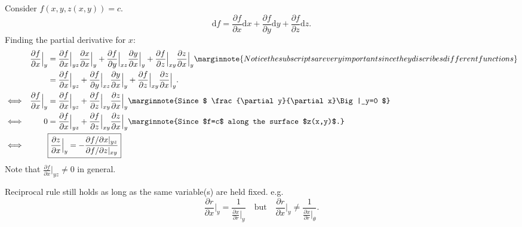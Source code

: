 \documentclass[10pt]{article}
\def\d{{\mathrm d}}
\begin{document}
        Consider $ f(x,y,z(x,y))=c $.
        \[
            \d f = \frac{\partial f}{\partial x}\d x+ \frac{\partial f}{\partial y}\d y+ \frac{\partial f}{\partial z}\d z   
        .\]
        Finding the partial derivative for $x$: 
        \[
            \begin{aligned}
                && \frac{\partial f}{\partial x}\Big|_y &= \frac{\partial f}{\partial x}\Big|_{yz}\frac{\partial x}{\partial x}\Big|_y+\frac{\partial f}{\partial y}\Big|_{xz}\frac{\partial y}{\partial x}\Big|_y+\frac{\partial f}{\partial z}\Big|_{xy}\frac{\partial z}{\partial x}\Big|_y\marginnote{Notice the subscripts are very important since they discribes different functions}\\
                && &= \frac{\partial f}{\partial x}\Big|_{yz}+\frac{\partial f}{\partial y}\Big|_{xz}\frac{\partial y}{\partial x}\Big|_y+\frac{\partial f}{\partial z}\Big|_{xy}\frac{\partial z}{\partial x}\Big|_y.\\
                &\Longleftrightarrow &\frac{\partial f}{\partial x}\Big|_y&=\frac{\partial f}{\partial x}\Big|_{yz}+\frac{\partial f}{\partial z}\Big|_{xy}\frac{\partial z}{\partial x}\Big|_y  \marginnote{Since $ \frac{\partial y}{\partial x}\Big|_y=0  $}  \\    
                &\Longleftrightarrow &0 &= \frac{\partial f}{\partial x}\Big|_{yz}+\frac{\partial f}{\partial z}\Big|_{xy}\frac{\partial z}{\partial x}\Big|_y \marginnote{Since $f=c$ along the surface $z(x,y)$.} \\
                &\Longleftrightarrow && \boxed{\frac{\partial z}{\partial x}\Big|_y=-\frac{\partial f/ \partial x|_{yz}}{\partial f/\partial z|_{xy}} }    
            \end{aligned}
        \]
        Note that $ \frac{\partial f}{\partial x}\Big|_{yz} \neq 0 $ in general.
        \begin{remark}
            Reciprocal rule still holds as long as the same variable(s) are held fixed. e.g.
            \[
                \frac{\partial r}{\partial x}\Big|_y = \frac{1}{\frac{\partial x}{\partial r}\Big|_y }\quad\text{but}\quad  \frac{\partial r}{\partial x}\Big|_y \neq \frac{1}{\frac{\partial x}{\partial r}\Big|_{\theta} }
            .\]
        \end{remark}
\end{document}
